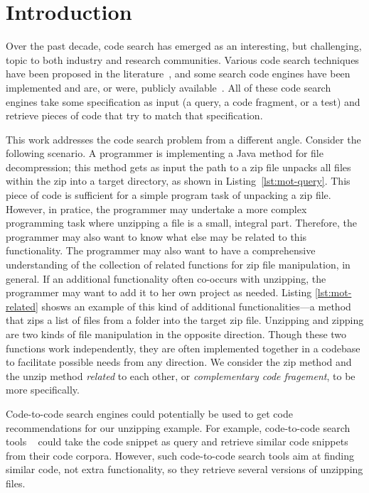 \section{Introduction}
\label{sec:intro}

Over the past decade, code search has emerged as an interesting, but
challenging, topic to both industry and research communities. Various code search
techniques have been proposed in the
literature~\cite{bajracharya2009sourcerer,reiss2009semantics,lazzarini2009applying,mcmillan2012exemplar}, and
some search code engines have been implemented and are, or were, publicly
available~\cite{googlesearch, github,codase,krugle,ohloh,searchcode}. All
of these code search engines take some specification as input (a
query, a code fragment, or a test) and retrieve pieces of code that try
to match that specification.


This work addresses the code search problem from a different angle. Consider
the following scenario. A programmer is implementing a Java method for
file decompression; this method gets as input the path to a zip file
 unpacks all files within the zip into a target directory, as shown in 
 Listing~\ref{lst:mot-query}. This piece of code is sufficient for 
 a simple program task of unpacking a zip file. However, in pratice, the programmer 
 may undertake a more complex programming task where unzipping a file is a small,
 integral part. Therefore, the programmer may also want to know what else may be
related to this functionality. %
The programmer may also want to have a comprehensive understanding of the collection of related
functions for zip file manipulation, in general. If an additional
functionality often co-occurs with unzipping, the programmer may want to add it
to her own project as needed. Listing \ref{lst:mot-related} shosws an example of this kind of additional 
functionalities---a method that zips a list of files from a folder into the target zip file. Unzipping
and zipping are two kinds of file manipulation in the opposite direction. 
Though these two functions work independently, they are often implemented together in a codebase to facilitate
possible needs from any direction. We consider the zip method and the unzip method {\em related} to each other, or {\em complementary code fragement}, to be more specifically.



Code-to-code search engines could potentially be used to get code
recommendations for our unzipping example. For example, code-to-code search tools
~\cite{kim2018Facoy, krugle, searchcode} could take the code snippet
as query and retrieve similar code snippets from their code
corpora. However, such code-to-code search tools aim at finding
similar code, not extra functionality, so they retrieve several
versions of unzipping files. 

